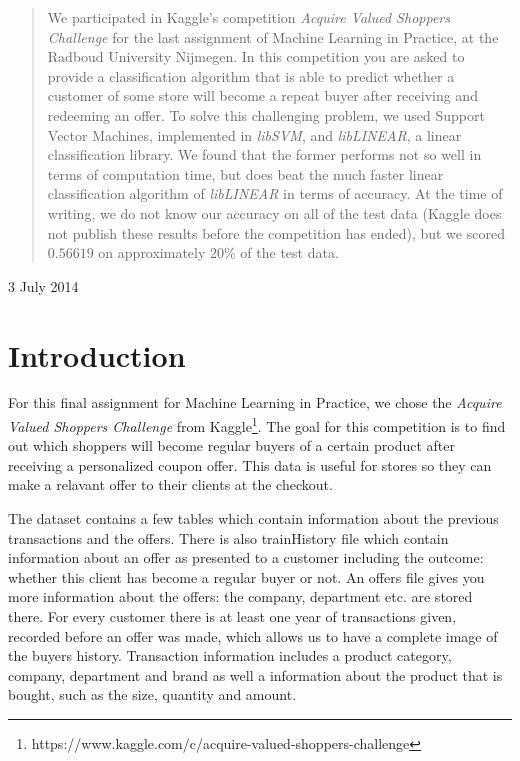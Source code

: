 \documentclass[a4paper]{article}
\begin{document}
\begin{titlepage}
\begin{center}
	\begin{abstract}
		We participated in Kaggle's competition \emph{Acquire Valued Shoppers Challenge} for the last assignment of Machine Learning in Practice, at the Radboud University Nijmegen. In this competition you are asked to provide a classification algorithm that is able to predict whether a customer of some store will become a repeat buyer after receiving and redeeming an offer. To solve this challenging problem, we used Support Vector Machines, implemented in \emph{libSVM}, and \emph{libLINEAR}, a linear classification library. We found that the former performs not so well in terms of computation time, but does beat the much faster linear classification algorithm of \emph{libLINEAR} in terms of accuracy. At the time of writing, we do not know our accuracy on all of the test data (Kaggle does not publish these results before the competition has ended), but we scored $0.56619$ on approximately 20\% of the test data.
	\end{abstract}
	\vspace{.7cm}

	{\large 3 July 2014}
	\vfill
	\end{center}

\end{titlepage}

\newpage

\section{Introduction}
For this final assignment for Machine Learning in Practice, we chose the \emph{Acquire Valued Shoppers Challenge} from Kaggle\footnote{https://www.kaggle.com/c/acquire-valued-shoppers-challenge}. The goal for this competition is to find out which shoppers will become regular buyers of a certain product after receiving a personalized coupon offer. This data is useful for stores so they can make a relavant offer to their clients at the checkout.

The dataset contains a few tables which contain information about the previous transactions and the offers. There is also trainHistory file which contain information about an offer as presented to a customer including the outcome: whether this client has become a regular buyer or not. An offers file gives you more information about the offers: the company, department etc. are stored there. For every customer there is at least one year of transactions given, recorded before an offer was made, which allows us to have a complete image of the buyers history. Transaction information includes a product category, company, department and brand as well a information about the product that is bought, such as the size, quantity and amount.
\end{document}
